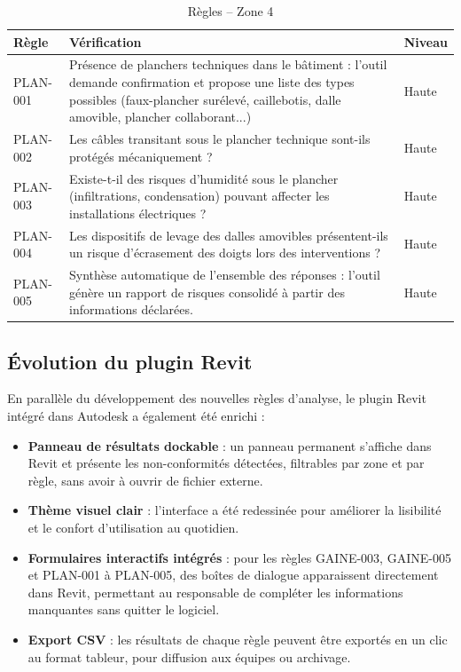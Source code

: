 \documentclass[a4paper,12pt]{article}
\begin{document}
\begin{table}[h!]
\centering
\begin{tabular}{p{1.8cm}p{9.5cm}p{2cm}}
\toprule
\textbf{Règle} & \textbf{Vérification} & \textbf{Niveau} \\
\midrule
PLAN-001 & Présence de planchers techniques dans le bâtiment : l'outil demande confirmation et propose une liste des types possibles (faux-plancher surélevé, caillebotis, dalle amovible, plancher collaborant...) & Haute \\[0.5em]
PLAN-002 & Les câbles transitant sous le plancher technique sont-ils protégés mécaniquement ? & Haute \\[0.5em]
PLAN-003 & Existe-t-il des risques d'humidité sous le plancher (infiltrations, condensation) pouvant affecter les installations électriques ? & Haute \\[0.5em]
PLAN-004 & Les dispositifs de levage des dalles amovibles présentent-ils un risque d'écrasement des doigts lors des interventions ? & Haute \\[0.5em]
PLAN-005 & Synthèse automatique de l'ensemble des réponses : l'outil génère un rapport de risques consolidé à partir des informations déclarées. & Haute \\
\bottomrule
\end{tabular}
\caption{Règles -- Zone 4}
\end{table}

\subsection{Évolution du plugin Revit}

En parallèle du développement des nouvelles règles d'analyse, le plugin Revit intégré dans Autodesk a également été enrichi :

\begin{itemize}
    \item \textbf{Panneau de résultats dockable} : un panneau permanent s'affiche dans Revit et présente les non-conformités détectées, filtrables par zone et par règle, sans avoir à ouvrir de fichier externe.
    \vspace{0.5em}
    \item \textbf{Thème visuel clair} : l'interface a été redessinée pour améliorer la lisibilité et le confort d'utilisation au quotidien.
    \vspace{0.5em}
    \item \textbf{Formulaires interactifs intégrés} : pour les règles GAINE-003, GAINE-005 et PLAN-001 à PLAN-005, des boîtes de dialogue apparaissent directement dans Revit, permettant au responsable de compléter les informations manquantes sans quitter le logiciel.
    \vspace{0.5em}
    \item \textbf{Export CSV} : les résultats de chaque règle peuvent être exportés en un clic au format tableur, pour diffusion aux équipes ou archivage.
\end{itemize}
\end{document}

